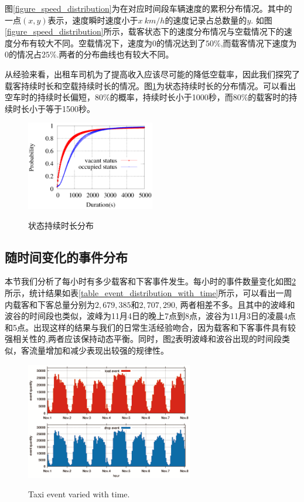 图\ref{figure_speed_distribution}为在对应时间段车辆速度的累积分布情况。其中的一点$(x,y)$表示，速度瞬时速度小于$x~km/h$的速度记录占总数量的$y$.
如图\ref{figure_speed_distribution}所示，载客状态下的速度分布情况与空载情况下的速度分布有较大不同。空载情况下，速度为0的情况达到了$50\%$,而载客情况下速度为0的情况占$25\%$.两者的分布曲线也有较大不同。


从经验来看，出租车司机为了提高收入应该尽可能的降低空载率，因此我们探究了载客持续时长和空载持续时长的情况。图\ref{figure_duration_for_each_status}为状态持续时长的分布情况。可以看出空车时的持续时长偏短，$80\%$的概率，持续时长小于1000秒，而$80\%$的载客时的持续时长小于等于1500秒。
\begin{figure}[ht]
\centering
\includegraphics[width=0.5\textwidth]{figures/assumption/durationdis.eps}\\
\caption{状态持续时长分布}\label{figure_duration_for_each_status}
\end{figure}


\subsection{随时间变化的事件分布}
本节我们分析了每小时有多少载客和下客事件发生。每小时的事件数量变化如图\ref{figure_event_varied_w_t}所示，统计结果如表\ref{table_event_distribution_with_time}所示，可以看出一周内载客和下客总量分别为$2,679,385$和$2,707,290$, 两者相差不多。且其中的波峰和波谷的时间段也类似，波峰为11月4日的晚上7点到8点，波谷为11月3日的凌晨4点和5点。出现这样的结果与我们的日常生活经验吻合，因为载客和下客事件具有较强相关性的,两者应该保持动态平衡。同时，图\ref{figure_event_varied_w_t}表明波峰和波谷出现的时间段类似，客流量增加和减少表现出较强的规律性。

\begin{figure}[!h]
\centering
\includegraphics[width=0.65\textwidth]{figures/analysis/event_w_time.eps}\\
\caption{Taxi event varied with time.}\label{figure_event_varied_w_t}
\end{figure}



